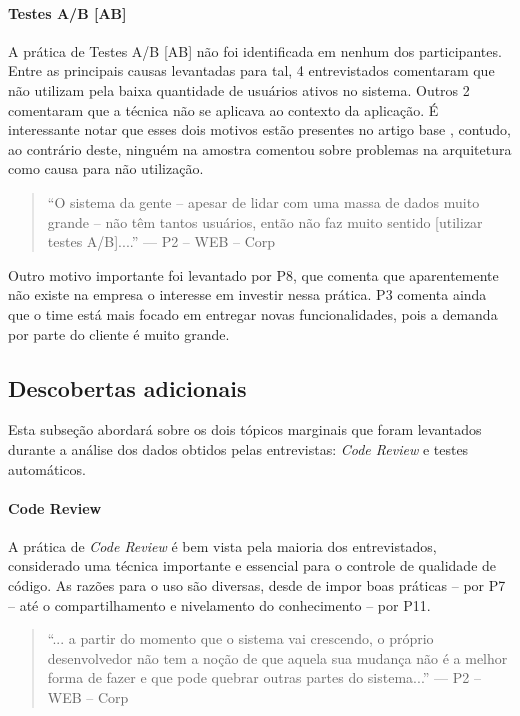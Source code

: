 \paragraph{Testes A/B [AB]}

A prática de Testes A/B [AB] não foi identificada em nenhum dos participantes. Entre as principais causas levantadas para tal, 4 entrevistados comentaram que não utilizam pela baixa quantidade de usuários ativos no sistema. Outros 2 comentaram que a técnica não se aplicava ao contexto da aplicação. É interessante notar que esses dois motivos estão presentes no artigo base \cite{empiricalStudy2016}, contudo, ao contrário deste, ninguém na amostra comentou sobre problemas na arquitetura como causa para não utilização.


\begin{quote}
    ``O sistema da gente -- apesar de lidar com uma massa de dados muito grande -- não têm tantos usuários, então não faz muito sentido [utilizar testes A/B]....'' --- P2 -- WEB -- Corp
\end{quote}

Outro motivo importante foi levantado por P8, que comenta que aparentemente não existe na empresa o interesse em investir nessa prática. P3 comenta ainda que o time está mais focado em entregar novas funcionalidades, pois a demanda por parte do cliente é muito grande.

\subsection{Descobertas adicionais}

Esta subseção abordará sobre os dois tópicos marginais que foram levantados durante a análise dos dados obtidos pelas entrevistas: \emph{Code Review} e testes automáticos.

\paragraph{Code Review}

A prática de \emph{Code Review} \cite{codeReview} é bem vista pela maioria dos entrevistados, considerado uma técnica importante e essencial para o controle de qualidade de código. As razões para o uso são diversas, desde de impor boas práticas -- por P7 -- até o compartilhamento e nivelamento do conhecimento -- por P11.

\begin{quote}
    ``... a partir do momento que o sistema vai crescendo, o próprio desenvolvedor não tem a noção de que aquela sua mudança não é a melhor forma de fazer e que pode quebrar outras partes do sistema...'' --- P2 -- WEB -- Corp
\end{quote}

